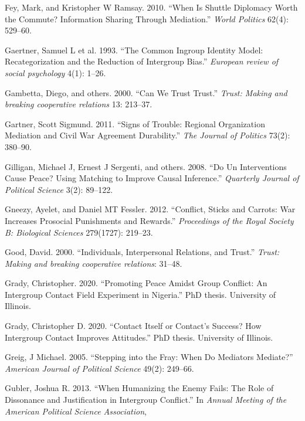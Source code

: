 \documentclass[11pt]{article}
\begin{document}
\leavevmode\hypertarget{ref-fey2010shuttle}{}%
Fey, Mark, and Kristopher W Ramsay. 2010. ``When Is Shuttle Diplomacy
Worth the Commute? Information Sharing Through Mediation.'' \emph{World
Politics} 62(4): 529--60.

\leavevmode\hypertarget{ref-gaertner1993common}{}%
Gaertner, Samuel L et al. 1993. ``The Common Ingroup Identity Model:
Recategorization and the Reduction of Intergroup Bias.'' \emph{European
review of social psychology} 4(1): 1--26.

\leavevmode\hypertarget{ref-gambetta_ch13}{}%
Gambetta, Diego, and others. 2000. ``Can We Trust Trust.'' \emph{Trust:
Making and breaking cooperative relations} 13: 213--37.

\leavevmode\hypertarget{ref-gartner2011signs}{}%
Gartner, Scott Sigmund. 2011. ``Signs of Trouble: Regional Organization
Mediation and Civil War Agreement Durability.'' \emph{The Journal of
Politics} 73(2): 380--90.

\leavevmode\hypertarget{ref-gilligan2008interventions}{}%
Gilligan, Michael J, Ernest J Sergenti, and others. 2008. ``Do Un
Interventions Cause Peace? Using Matching to Improve Causal Inference.''
\emph{Quarterly Journal of Political Science} 3(2): 89--122.

\leavevmode\hypertarget{ref-gneezy2012conflict}{}%
Gneezy, Ayelet, and Daniel MT Fessler. 2012. ``Conflict, Sticks and
Carrots: War Increases Prosocial Punishments and Rewards.''
\emph{Proceedings of the Royal Society B: Biological Sciences}
279(1727): 219--23.

\leavevmode\hypertarget{ref-good2000individuals}{}%
Good, David. 2000. ``Individuals, Interpersonal Relations, and Trust.''
\emph{Trust: Making and breaking cooperative relations}: 31--48.

\leavevmode\hypertarget{ref-grady2020farmer}{}%
Grady, Christopher. 2020. ``Promoting Peace Amidst Group Conflict: An
Intergroup Contact Field Experiment in Nigeria.'' PhD thesis. University
of Illinois.

\leavevmode\hypertarget{ref-grady2020lab}{}%
Grady, Christopher D. 2020. ``Contact Itself or Contact's Success? How
Intergroup Contact Improves Attitudes.'' PhD thesis. University of
Illinois.

\leavevmode\hypertarget{ref-greig2005stepping}{}%
Greig, J Michael. 2005. ``Stepping into the Fray: When Do Mediators
Mediate?'' \emph{American Journal of Political Science} 49(2): 249--66.

\leavevmode\hypertarget{ref-gubler2013humanizing}{}%
Gubler, Joshua R. 2013. ``When Humanizing the Enemy Fails: The Role of
Dissonance and Justification in Intergroup Conflict.'' In \emph{Annual
Meeting of the American Political Science Association},
\end{document}
